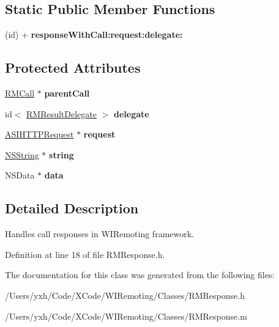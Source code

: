 \subsection*{Static Public Member Functions}
\begin{DoxyCompactItemize}
\item 
\hypertarget{interface_r_m_response_ada22bb0cc944b2d3db0d22b556a24daf}{
(id) + {\bfseries responseWithCall:request:delegate:}}
\label{interface_r_m_response_ada22bb0cc944b2d3db0d22b556a24daf}

\end{DoxyCompactItemize}
\subsection*{Protected Attributes}
\begin{DoxyCompactItemize}
\item 
\hypertarget{interface_r_m_response_aead684dffc01908a30b52a9fec734939}{
\hyperlink{interface_r_m_call}{RMCall} $\ast$ {\bfseries parentCall}}
\label{interface_r_m_response_aead684dffc01908a30b52a9fec734939}

\item 
\hypertarget{interface_r_m_response_a99df96e18e793bbd99aa1d2cce3e2e6f}{
id$<$ \hyperlink{protocol_r_m_result_delegate-p}{RMResultDelegate} $>$ {\bfseries delegate}}
\label{interface_r_m_response_a99df96e18e793bbd99aa1d2cce3e2e6f}

\item 
\hypertarget{interface_r_m_response_a8100e3ff4d7ad1ec1707c763a8690ff4}{
\hyperlink{interface_a_s_i_h_t_t_p_request}{ASIHTTPRequest} $\ast$ {\bfseries request}}
\label{interface_r_m_response_a8100e3ff4d7ad1ec1707c763a8690ff4}

\item 
\hypertarget{interface_r_m_response_a8a916fbec7712a005e611b7f5e4f4bdf}{
\hyperlink{class_n_s_string}{NSString} $\ast$ {\bfseries string}}
\label{interface_r_m_response_a8a916fbec7712a005e611b7f5e4f4bdf}

\item 
\hypertarget{interface_r_m_response_a420513833840b50a963a6a1c2f02b975}{
NSData $\ast$ {\bfseries data}}
\label{interface_r_m_response_a420513833840b50a963a6a1c2f02b975}

\end{DoxyCompactItemize}


\subsection{Detailed Description}
Handles call responses in WIRemoting framework. 

Definition at line 18 of file RMResponse.h.

The documentation for this class was generated from the following files:\begin{DoxyCompactItemize}
\item 
/Users/yxh/Code/XCode/WIRemoting/Classes/RMResponse.h\item 
/Users/yxh/Code/XCode/WIRemoting/Classes/RMResponse.m\end{DoxyCompactItemize}
